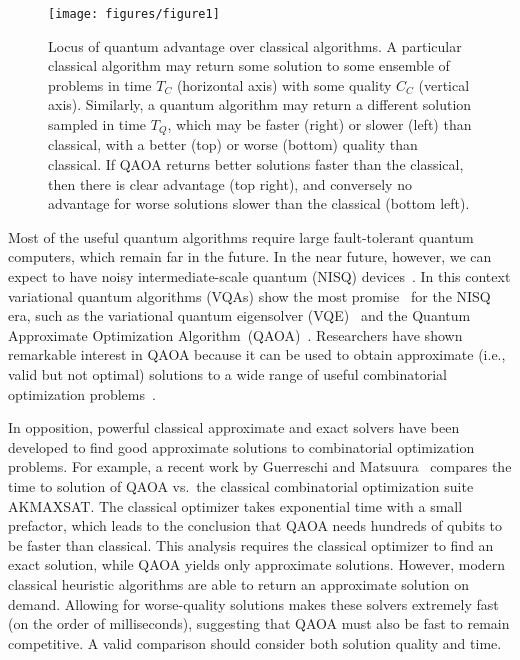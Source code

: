 \documentclass[prb,reprint,nofootinbib,longbibliography,superscriptaddress]{revtex4-1}
\begin{document}
\begin{figure}[h!t] %

    \centering
    \texttt{[image: figures/figure1]}
    \caption{Locus of quantum advantage over classical algorithms. A particular classical algorithm may return some solution to some ensemble of problems in time $T_C$ (horizontal axis) with some quality $C_C$ (vertical axis). Similarly, a quantum algorithm may return a different solution sampled in time $T_Q$, which may be faster (right) or slower (left) than classical, with a better (top) or worse (bottom) quality than classical. If QAOA returns better solutions faster than the classical, then there is clear advantage (top right), and conversely  no advantage for worse solutions slower than the classical (bottom left).}
    \label{fig:comparison_map}
\end{figure}

Most of the useful quantum algorithms require large fault-tolerant quantum computers, which remain far in the future. In the near future, however, we can expect to have noisy intermediate-scale quantum (NISQ) devices~\cite{Preskill2018}. 
In this context variational quantum algorithms (VQAs) show the most promise~\cite{VQA_overview} for the NISQ era, such as the variational quantum eigensolver (VQE)~\cite{peruzzo2014variational} and the Quantum Approximate Optimization Algorithm~(QAOA)~\cite{farhi2014quantum}.
Researchers have shown remarkable interest in QAOA because it can be used to obtain approximate (i.e., valid but not optimal) solutions to a wide range of useful combinatorial optimization problems~\cite{ebadi2022, farhi2020quantum, Chatterjee2021}.


In opposition, powerful classical approximate and exact solvers have been developed to find good approximate solutions to combinatorial optimization problems. For example, a recent work by Guerreschi and Matsuura~\cite{Guerreschi2019} compares the time to solution of QAOA vs.~the classical combinatorial optimization suite AKMAXSAT. The classical optimizer takes exponential time with a small prefactor, which leads to the conclusion that QAOA needs hundreds of qubits to be faster than classical. This analysis requires the classical optimizer to find an exact solution, while QAOA  yields only approximate solutions. However, modern classical heuristic algorithms are able to return an approximate solution on demand.
Allowing for worse-quality solutions makes these solvers extremely fast (on the order of milliseconds), suggesting that QAOA must also be fast to remain competitive.
A valid comparison should consider both solution quality and time.
\end{document}
